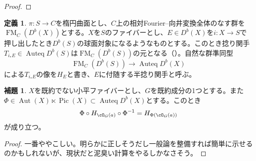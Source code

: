 \documentclass[uplatex, a4paper, dvipdfmx]{jsarticle}
\theoremstyle{definition}
\newtheorem{definition}[theorem]{定義}
\newtheorem{lemma}[theorem]{補題}
\DeclareMathOperator{\Hom}{\mathrm{Hom}}
\DeclareMathOperator{\Auteq}{\mathrm{Auteq}}
\DeclareMathOperator{\Pic}{\mathrm{Pic}}
\DeclareMathOperator{\Ker}{\mathrm{Ker}}
\DeclareMathOperator{\Aut}{\mathrm{Aut}}
\DeclareMathOperator{\Ext}{\mathrm{Ext}}
\DeclareMathOperator{\FM}{\mathrm{FM}}
\begin{document}
\begin{proof}

\end{proof}

\begin{definition}
    $\pi \colon S \to C$を楕円曲面とし、$C$上の相対Fourier--向井変換全体のなす群を$\FM_C(D^b(X))$とする。$X$を$S$のファイバーとし、$E \in D^b(X)$を$i \colon X \to S$で押し出したとき$D^b(S)$の球面対象になるようなものとする。このとき捻り関手$T_{i_*E} \in \Auteq D^b(S)$は$\FM_C(D^b(S))$の元となる（\cite{2023arXiv230212501A}）。自然な群準同型
    \begin{equation}
        \FM_C(D^b(S)) \to \Auteq D^b(X)
    \end{equation}
    による$T_{i_*E}$の像を$H_E$と書き、$E$に付随する半捻り関手と呼ぶ。
\end{definition}
\begin{lemma}\label{lem:conjugate-action}
    $X$を既約でない小平ファイバーとし、$G$を既約成分の1つとする。また$\Phi \in \Aut(X) \ltimes \Pic(X) \subset \Auteq D^b(X)$とする。このとき
    \begin{equation}
        \Phi \circ H_{\cO_G(a)}\circ \Phi^{-1} = H_{\Phi(\cO_G(a))}
    \end{equation}
    が成り立つ。
\end{lemma}
\begin{proof}
    一番ややこしい。明らかに正しそうだし一般論を整備すれば簡単に示せるのかもしれないが、現状だと泥臭い計算をやるしかなさそう。
\end{proof}
\end{document}
